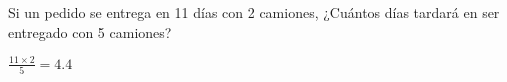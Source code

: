 
\question Si un pedido se entrega en 11 días con 2 camiones,
          ¿Cuántos días tardará en ser entregado con 5 camiones?

  \begin{solution}[2cm]
      $\frac{11 \times 2}{5} = 4.4$
  \end{solution}
